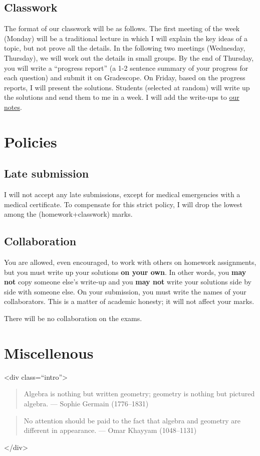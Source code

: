 \documentclass[11pt]{article}
\begin{document}
\subsection{Classwork}
\label{sec:org77d74b8}
The format of our classwork will be as follows. The first meeting of the week (Monday) will be a traditional lecture in which I will explain the key ideas of a topic, but not prove all the details. In the following two meetings (Wednesday, Thursday), we will work out the details in small groups. By the end of Thursday, you will write a ``progress report'' (a 1-2 sentence summary of your progress for each question) and submit it on Gradescope. On Friday, based on the progress reports, I will present the solutions. Students (selected at random) will write up the solutions and send them to me in a week. I will add the write-ups to \href{notes}{our notes}. 

\section{Policies}
\label{sec:orgaef2818}
\subsection{Late submission}
\label{sec:orgb0b89ca}
I will not accept any late submissions, except for medical emergencies with a medical certificate.
To compensate for this strict policy, I will drop the lowest among the (homework+classwork) marks.

\subsection{Collaboration}
\label{sec:orgef6576a}
You are allowed, even encouraged, to work with others on homework assignments, but you must write up your solutions \textbf{on your own}. In other words, you \textbf{may not} copy someone else's write-up and you \textbf{may not} write your solutions side by side with someone else. On your submission, you must write the names of your collaborators. This is a matter of academic honesty; it will not affect your marks. 

There will be no collaboration on the exams.

\section{Miscellenous}
\label{sec:org11b8f52}
<div class=``intro''>
\begin{quote}
Algebra is nothing but written geometry; geometry is nothing but pictured algebra.  
--- Sophie Germain (1776--1831)
\end{quote}
\begin{quote}
No attention should be paid to the fact that algebra and geometry are different in appearance.  
--- Omar Khayyam (1048--1131)
\end{quote}
</div>
\end{document}
